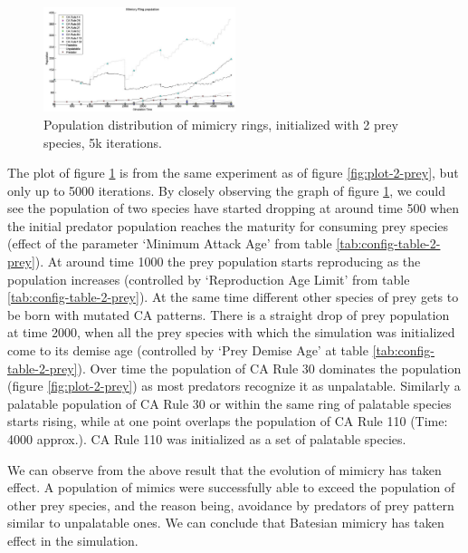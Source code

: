 \documentclass[letterpaper]{article}
\numberwithin{equation}{section}
\begin{document}
\begin{figure}[H]
	\centering
	\includegraphics[width=0.5\textwidth]{../tex/images/simTime5k-2Prey}
	\caption[Population distribution of mimicry rings (2 prey species, 5k iterations)]{Population distribution of mimicry rings, initialized with 2 prey species, 5k iterations.}
	\label{fig:plot-2-prey-5k}
\end{figure}

The plot of figure \ref{fig:plot-2-prey-5k} is from the same experiment as of figure \ref{fig:plot-2-prey}, but only up to 5000 iterations. By closely observing the graph of figure \ref{fig:plot-2-prey-5k}, we could see the population of two species have started dropping at around time 500 when the initial predator population reaches the maturity for consuming prey species (effect of the parameter `Minimum Attack Age' from table \ref{tab:config-table-2-prey}). At around time 1000 the prey population starts reproducing as the population increases (controlled by `Reproduction Age Limit' from table \ref{tab:config-table-2-prey}). At the same time different other species of prey gets to be born with mutated CA patterns. There is a straight drop of prey population at time 2000, when all the prey species with which the simulation was initialized come to its demise age (controlled by `Prey Demise Age' at table \ref{tab:config-table-2-prey}). Over time the population of CA Rule 30 dominates the population (figure \ref{fig:plot-2-prey}) as most predators recognize it as unpalatable. Similarly a palatable population of CA Rule 30 or within the same ring of palatable species starts rising, while at one point overlaps the population of CA Rule 110 (Time: 4000 approx.). CA Rule 110 was initialized as a set of palatable species.

We can observe from the above result that the evolution of mimicry has taken effect. A population of mimics were successfully able to exceed the population of other prey species, and the reason being, avoidance by predators of prey pattern similar to unpalatable ones. We can conclude that Batesian mimicry has taken effect in the simulation.
\end{document}

